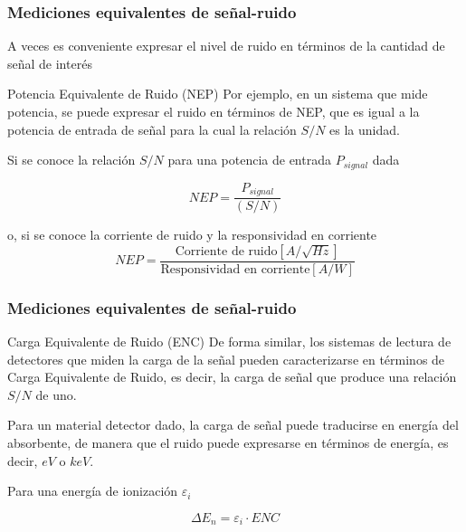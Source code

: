 \documentclass{beamer}
\begin{document}
\begin{frame}
\frametitle{Mediciones equivalentes de señal-ruido}
A veces es conveniente expresar el nivel de ruido en t\'erminos de la cantidad de
señal de inter\'es
\begin{block}{Potencia Equivalente de Ruido (NEP)}
Por ejemplo, en un sistema que mide potencia, se puede expresar el ruido en
t\'erminos de NEP, que es igual a \alert{la potencia de entrada de señal para la cual la
relaci\'on $S/N$ es la unidad}.

Si se conoce la relaci\'on $S/N$ para una potencia de entrada $P_{signal}$ dada

$$NEP = \frac{P_{signal}}{(S/N)}$$

o, si se conoce la corriente de ruido y la responsividad en corriente
$$NEP = \frac{\text{Corriente de ruido}[A/\sqrt{Hz}]}{\text{Responsividad en
corriente}[A/W]}$$
\end{block}
\end{frame} 

\begin{frame}
\frametitle{Mediciones equivalentes de señal-ruido}
\begin{block}{Carga Equivalente de Ruido (ENC)}
De forma similar, los sistemas de lectura de detectores que miden la carga de la
señal pueden caracterizarse en t\'erminos de Carga Equivalente de Ruido, es decir,
\alert{la carga de señal que produce una relaci\'on $S/N$ de uno}.

Para un material detector dado, la carga de señal puede traducirse en energ\'ia
del absorbente, de manera que el ruido puede expresarse en t\'erminos de energ\'ia,
es decir, $eV$ o $keV$.

Para una energ\'ia de ionizaci\'on $\varepsilon_i$

$$\Delta E_n = \varepsilon_i \cdot ENC$$

\end{block}
\end{frame} 
\end{document}
